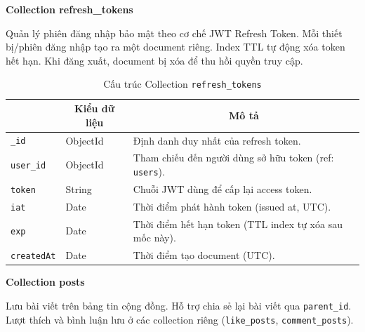 \textbf{Collection refresh\_tokens}
\label{subsec:col_refresh_tokens}

Quản lý phiên đăng nhập bảo mật theo cơ chế JWT Refresh Token. Mỗi thiết bị/phiên đăng nhập tạo ra một document riêng. Index TTL tự động xóa token hết hạn. Khi đăng xuất, document bị xóa để thu hồi quyền truy cập.

\begin{table}[H]
\centering
\footnotesize
\setlength{\tabcolsep}{5pt}
\renewcommand{\arraystretch}{1.15}
\begin{tabularx}{\textwidth}{|p{3.6cm}|p{2.6cm}|X|}
\hline
\rowcolor{dbheadblue}
\multicolumn{1}{|c|}{\color{white}\textbf{Trường}} &
\multicolumn{1}{c|}{\color{white}\textbf{Kiểu dữ liệu}} &
\multicolumn{1}{c|}{\color{white}\textbf{Mô tả}} \\
\hline
\texttt{\_id}        & ObjectId  & Định danh duy nhất của refresh token. \\ \hline
\rowcolor{dbrowalt}
\texttt{user\_id}    & ObjectId  & Tham chiếu đến người dùng sở hữu token (ref: \texttt{users}). \\ \hline
\texttt{token}      & String    & Chuỗi JWT dùng để cấp lại access token. \\ \hline
\rowcolor{dbrowalt}
\texttt{iat}        & Date      & Thời điểm phát hành token (issued at, UTC). \\ \hline
\texttt{exp}        & Date      & Thời điểm hết hạn token (TTL index tự xóa sau mốc này). \\ \hline
\rowcolor{dbrowalt}
\texttt{createdAt}  & Date      & Thời điểm tạo document (UTC). \\ \hline
\end{tabularx}
\caption{Cấu trúc Collection \texttt{refresh\_tokens}}
\label{tab:col_refresh_tokens}
\end{table}

\textbf{Collection posts}
\label{subsec:col_posts}

Lưu bài viết trên bảng tin cộng đồng. Hỗ trợ chia sẻ lại bài viết qua \texttt{parent\_id}. Lượt thích và bình luận lưu ở các collection riêng (\texttt{like\_posts}, \texttt{comment\_posts}).

